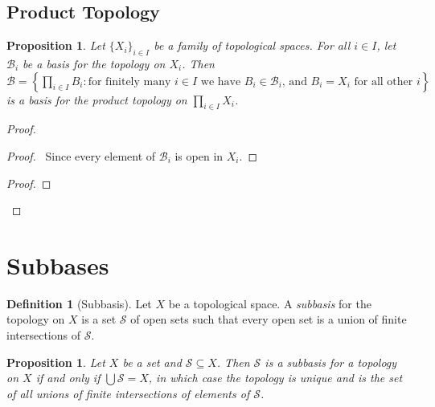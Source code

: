 \documentclass{book}
\let\qed\relax
\newtheorem{prop}[ax]{Proposition}
\theoremstyle{definition}
\newtheorem{df}[ax]{Definition}
\begin{document}
\subsection{Product Topology}

\begin{prop}
Let $\{X_i\}_{i \in I}$ be a family of topological spaces. For all $i \in I$, let $\mathcal{B}_i$ be a basis for the topology on $X_i$. Then $\mathcal{B} = \left\{ \prod_{i \in I} B_i : \text{for finitely many $i \in I$ we have $B_i \in \mathcal{B}_i$, and $B_i = X_i$ for all other $i$} \right\}$ is a basis for the product topology on $\prod_{i \in I} X_i$.
\end{prop}

\begin{proof}
\pf
{}
\begin{proof}
	\pf\ Since every element of $\mathcal{B}_i$ is open in $X_i$.
\end{proof}
\begin{proof}
\end{proof}
\qed
\end{proof}

\section{Subbases}

\begin{df}[Subbasis]
Let $X$ be a topological space. A \emph{subbasis} for the topology on $X$ is a set $\mathcal{S}$ of open sets such that every open set is a union of finite intersections of $\mathcal{S}$.
\end{df}

\begin{prop}
Let $X$ be a set and $\mathcal{S} \subseteq X$. Then $\mathcal{S}$ is a subbasis for a topology on $X$ if and only if $\bigcup \mathcal{S} = X$, in which case the topology is unique and is the set of all unions of finite intersections of elements of $\mathcal{S}$.
\end{prop}
\end{document}
